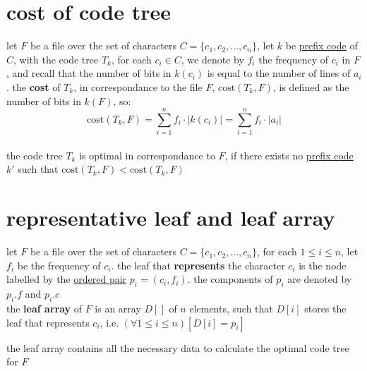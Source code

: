\documentclass[a4paper,12pt]{article}
\newcommand{\?}{\stackrel{?}{=}}
\begin{document}
\section{cost of code tree}
\label{sec:orgd7d6a6d}
let \(F\) be a file over the set of characters \(C=\{c_1,c_2,\dots,c_n\}\), let \(k\) be \href{20230119174917-prefix_code.org}{prefix code} of \(C\), with the code tree \(T_k\), for each \(c_i \in C\), we denote by \(f_i\) the frequency of \(c_i\) in \(F\), and recall that the number of bits in \(k(c_i)\) is equal to the number of lines of \(a_i\). the \textbf{cost} of \(T_k\), in correspondance to the file \(F\), \(\mathrm{cost}(T_k,F)\), is defined as the number of bits in \(k(F)\), so:\\[0pt]
\[
\mathrm{cost}(T_k,F) = \sum_{i=1}^{n} f_i \cdot |k(c_i)| = \sum_{i=1}^{n} f_i \cdot |a_i| 
\]\\[0pt]
the code tree \(T_k\) is optimal in correspondance to \(F\), if there exists no \href{20230119174917-prefix_code.org}{prefix code} \(k'\) such that \(\mathrm{cost}(T_k,F) < \mathrm{cost}(T_k,F)\)\\[0pt]
\section{representative leaf and leaf array}
\label{sec:org9e58d4f}
let \(F\) be a file over the set of characters \(C=\{c_1,c_2,\dots,c_n\}\), for each \(1 \le i \le n\), let \(f_i\) be the frequency of \(c_i\). the leaf that \textbf{represents} the character \(c_i\) is the node labelled by the \href{discrete_maths2.org}{ordered pair} \(p_i=(c_i,f_i)\). the components of \(p_i\) are denoted by \(p_i.f\) and \(p_i.c\)\\[0pt]
the \textbf{leaf array} of \(F\) is an array \(D[]\) of \(n\) elements, such that \(D[i]\) stores the leaf that represents \(c_i\), i.e. \((\forall 1 \le i \le n)[D[i]=p_i]\)\\[0pt]
\begin{note}
the leaf array contains all the necessary data to calculate the optimal code tree for \(F\)\\[0pt]
\end{note}
\end{document}
